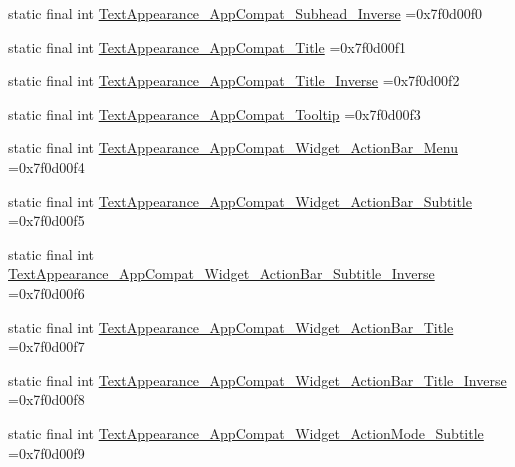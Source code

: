 \begin{DoxyCompactItemize}
\item 
static final int \mbox{\hyperlink{classbr_1_1unb_1_1cic_1_1mp_1_1marketmaster_1_1R_1_1style_a84a4aa60ccb82414bf4b52228026f2c5}{Text\+Appearance\+\_\+\+App\+Compat\+\_\+\+Subhead\+\_\+\+Inverse}} =0x7f0d00f0
\item 
static final int \mbox{\hyperlink{classbr_1_1unb_1_1cic_1_1mp_1_1marketmaster_1_1R_1_1style_a7d176c9abf63519d603713a363bfea00}{Text\+Appearance\+\_\+\+App\+Compat\+\_\+\+Title}} =0x7f0d00f1
\item 
static final int \mbox{\hyperlink{classbr_1_1unb_1_1cic_1_1mp_1_1marketmaster_1_1R_1_1style_a0ef6aad03d9df69572cb3349e97a478b}{Text\+Appearance\+\_\+\+App\+Compat\+\_\+\+Title\+\_\+\+Inverse}} =0x7f0d00f2
\item 
static final int \mbox{\hyperlink{classbr_1_1unb_1_1cic_1_1mp_1_1marketmaster_1_1R_1_1style_a098b9276a294d4ba7f6dbdf94de72c26}{Text\+Appearance\+\_\+\+App\+Compat\+\_\+\+Tooltip}} =0x7f0d00f3
\item 
static final int \mbox{\hyperlink{classbr_1_1unb_1_1cic_1_1mp_1_1marketmaster_1_1R_1_1style_adacf6448bd5941527c38539286aaa186}{Text\+Appearance\+\_\+\+App\+Compat\+\_\+\+Widget\+\_\+\+Action\+Bar\+\_\+\+Menu}} =0x7f0d00f4
\item 
static final int \mbox{\hyperlink{classbr_1_1unb_1_1cic_1_1mp_1_1marketmaster_1_1R_1_1style_aab222392cba0d09a4730d077e44c0e44}{Text\+Appearance\+\_\+\+App\+Compat\+\_\+\+Widget\+\_\+\+Action\+Bar\+\_\+\+Subtitle}} =0x7f0d00f5
\item 
static final int \mbox{\hyperlink{classbr_1_1unb_1_1cic_1_1mp_1_1marketmaster_1_1R_1_1style_a0c49a2b74d34d71f2f3e399c1f7f78fb}{Text\+Appearance\+\_\+\+App\+Compat\+\_\+\+Widget\+\_\+\+Action\+Bar\+\_\+\+Subtitle\+\_\+\+Inverse}} =0x7f0d00f6
\item 
static final int \mbox{\hyperlink{classbr_1_1unb_1_1cic_1_1mp_1_1marketmaster_1_1R_1_1style_a0e156604bd18a451c5da3c0c35e97bab}{Text\+Appearance\+\_\+\+App\+Compat\+\_\+\+Widget\+\_\+\+Action\+Bar\+\_\+\+Title}} =0x7f0d00f7
\item 
static final int \mbox{\hyperlink{classbr_1_1unb_1_1cic_1_1mp_1_1marketmaster_1_1R_1_1style_ae35ca079b907936fda7a6a3111687873}{Text\+Appearance\+\_\+\+App\+Compat\+\_\+\+Widget\+\_\+\+Action\+Bar\+\_\+\+Title\+\_\+\+Inverse}} =0x7f0d00f8
\item 
static final int \mbox{\hyperlink{classbr_1_1unb_1_1cic_1_1mp_1_1marketmaster_1_1R_1_1style_af69535f2dc5e6fcd6ba0bab48c4e7185}{Text\+Appearance\+\_\+\+App\+Compat\+\_\+\+Widget\+\_\+\+Action\+Mode\+\_\+\+Subtitle}} =0x7f0d00f9

\end{DoxyCompactItemize}

